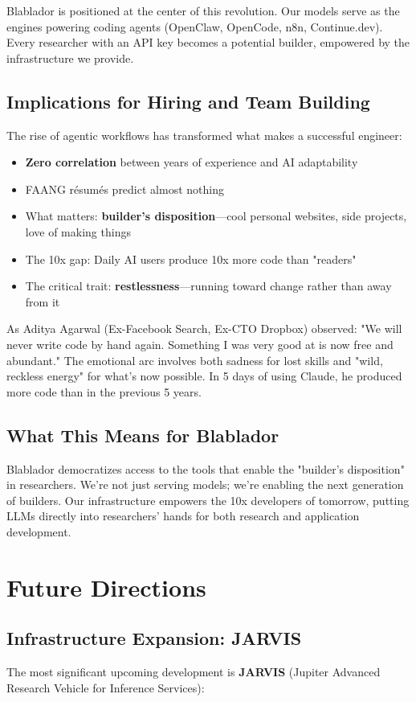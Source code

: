 \documentclass[10pt,conference]{IEEEtran}
\begin{document}
Blablador is positioned at the center of this revolution. Our models serve as the engines powering coding agents (OpenClaw, OpenCode, n8n, Continue.dev). Every researcher with an API key becomes a potential builder, empowered by the infrastructure we provide.

\subsection{Implications for Hiring and Team Building}
The rise of agentic workflows has transformed what makes a successful engineer:
\begin{itemize}
    \item \textbf{Zero correlation} between years of experience and AI adaptability
    \item FAANG résumés predict almost nothing
    \item What matters: \textbf{builder's disposition}—cool personal websites, side projects, love of making things
    \item The 10x gap: Daily AI users produce 10x more code than "readers"
    \item The critical trait: \textbf{restlessness}—running toward change rather than away from it
\end{itemize}

As Aditya Agarwal (Ex-Facebook Search, Ex-CTO Dropbox) observed: "We will never write code by hand again. Something I was very good at is now free and abundant." The emotional arc involves both sadness for lost skills and "wild, reckless energy" for what's now possible. In 5 days of using Claude, he produced more code than in the previous 5 years.

\subsection{What This Means for Blablador}
Blablador democratizes access to the tools that enable the "builder's disposition" in researchers. We're not just serving models; we're enabling the next generation of builders. Our infrastructure empowers the 10x developers of tomorrow, putting LLMs directly into researchers' hands for both research and application development.

\section{Future Directions}
\subsection{Infrastructure Expansion: JARVIS}
The most significant upcoming development is \textbf{JARVIS} (Jupiter Advanced Research Vehicle for Inference Services):
\end{document}
